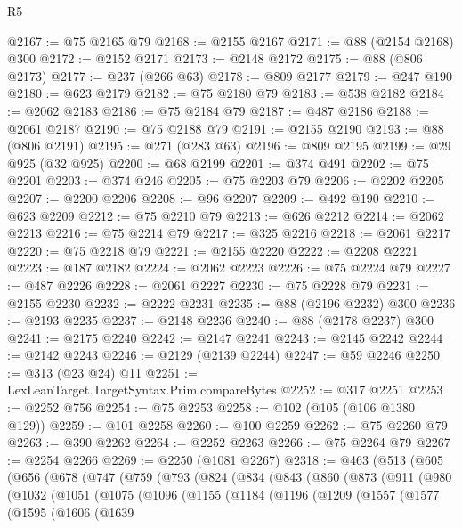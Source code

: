 \begin{lexlean}{R5}
\begin{coremodule}
@2167 := @75 @2165 @79
@2168 := @2155 @2167
@2171 := @88 (@2154 @2168) @300
@2172 := @2152 @2171
@2173 := @2148 @2172
@2175 := @88 (@806 @2173)
@2177 := @237 (@266 @63)
@2178 := @809 @2177
@2179 := @247 @190
@2180 := @623 @2179
@2182 := @75 @2180 @79
@2183 := @538 @2182
@2184 := @2062 @2183
@2186 := @75 @2184 @79
@2187 := @487 @2186
@2188 := @2061 @2187
@2190 := @75 @2188 @79
@2191 := @2155 @2190
@2193 := @88 (@806 @2191)
@2195 := @271 (@283 @63)
@2196 := @809 @2195
@2199 := @29 @925 (@32 @925)
@2200 := @68 @2199
@2201 := @374 @491
@2202 := @75 @2201
@2203 := @374 @246
@2205 := @75 @2203 @79
@2206 := @2202 @2205
@2207 := @2200 @2206
@2208 := @96 @2207
@2209 := @492 @190
@2210 := @623 @2209
@2212 := @75 @2210 @79
@2213 := @626 @2212
@2214 := @2062 @2213
@2216 := @75 @2214 @79
@2217 := @325 @2216
@2218 := @2061 @2217
@2220 := @75 @2218 @79
@2221 := @2155 @2220
@2222 := @2208 @2221
@2223 := @187 @2182
@2224 := @2062 @2223
@2226 := @75 @2224 @79
@2227 := @487 @2226
@2228 := @2061 @2227
@2230 := @75 @2228 @79
@2231 := @2155 @2230
@2232 := @2222 @2231
@2235 := @88 (@2196 @2232) @300
@2236 := @2193 @2235
@2237 := @2148 @2236
@2240 := @88 (@2178 @2237) @300
@2241 := @2175 @2240
@2242 := @2147 @2241
@2243 := @2145 @2242
@2244 := @2142 @2243
@2246 := @2129 (@2139 @2244)
@2247 := @59 @2246
@2250 := @313 (@23 @24) @11
@2251 := LexLeanTarget.TargetSyntax.Prim.compareBytes
@2252 := @317 @2251
@2253 := @2252 @756
@2254 := @75 @2253
@2258 := @102 (@105 (@106 @1380 @129))
@2259 := @101 @2258
@2260 := @100 @2259
@2262 := @75 @2260 @79
@2263 := @390 @2262
@2264 := @2252 @2263
@2266 := @75 @2264 @79
@2267 := @2254 @2266
@2269 := @2250 (@1081 @2267)
@2318 := @463
    (@513
      (@605
        (@656
          (@678
            (@747
              (@759
                (@793
                  (@824
                    (@834
                      (@843
                        (@860
                          (@873
                            (@911
                              (@980
                                (@1032
                                  (@1051
                                    (@1075
                                      (@1096
                                        (@1155
                                          (@1184
                                            (@1196
                                              (@1209
                                                (@1557
                                                  (@1577
                                                    (@1595
                                                      (@1606
                                                        (@1639

\end{coremodule}
\end{lexlean}
